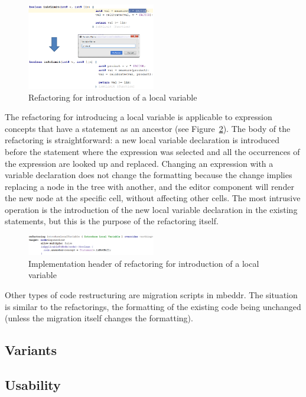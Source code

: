 \documentclass[preprint,numbers,10pt]{sigplanconf}
\begin{document}
\begin{figure}[H]
	\centering
	\includegraphics[width=0.50\textwidth]{screens/IntroLocalVar.png}
	\caption{Refactoring for introduction of a local variable}
	\label{fig:IntroLocalVar}
\end{figure}

The refactoring for introducing a local variable is applicable to expression concepts that have a statement as an
ancestor (see Figure~\ref{fig:RefactoringImpl}). The body of the refactoring is straightforward:
a new local variable declaration is introduced before the statement where the expression was selected and all
the occurrences of the expression are looked up and replaced. Changing an expression with a variable declaration
does not change the formatting because the change implies replacing a node in the tree with another, and the editor
component will render the new node at the specific cell, without affecting other cells. The most intrusive operation is the
introduction of the new local variable declaration in the existing statements, but this is the purpose of the
refactoring itself.

\begin{figure}[H]
	\centering
	\includegraphics[width=0.50\textwidth]{screens/RefactoringImpl.png}
	\caption{Implementation header of refactoring for introduction of a local variable}
	\label{fig:RefactoringImpl}
\end{figure}

Other types of code restructuring are migration scripts in mbeddr. The situation is similar to the refactorings, the
formatting of the existing code being unchanged (unless the migration itself changes the formatting).
\subsection{Variants}

\subsection{Usability}
\end{document}
